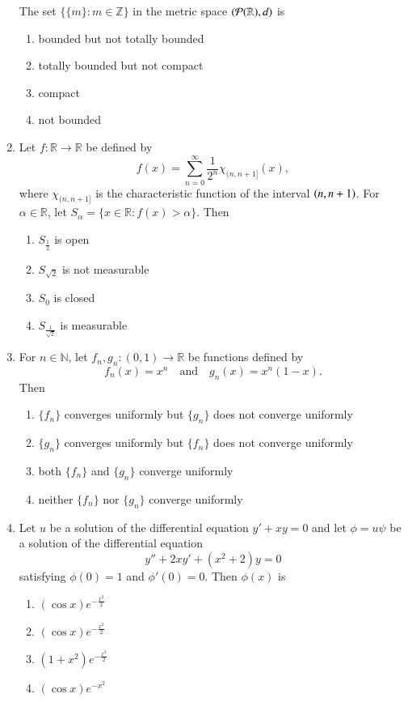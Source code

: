 \documentclass[journal,12pt,onecolumn]{IEEEtran}
\theoremstyle{remark}
\begin{document}
\begin{enumerate}[start=1, label=Q.\arabic*]
The set $\{ \{m\} : m \in \mathbb{Z}\}$ in the metric space $\left(\mathcal{P}(\mathbb{R}), d\right)$ is
\begin{enumerate}
\item bounded but not totally bounded
\item totally bounded but not compact
\item compact
\item not bounded
\end{enumerate}

\hfill{}

\item Let $f: \mathbb{R} \to \mathbb{R}$ be defined by
\[
f(x) = \sum_{n=0}^{\infty} \frac{1}{2^n}\chi_{(n,n+1]}(x),
\]
where $\chi_{(n,n+1]}$ is the characteristic function of the interval $\left(n,n+1\right)$. For $\alpha \in \mathbb{R}$, let $S_{\alpha} = \{x \in \mathbb{R} : f(x) > \alpha \}$. Then
\begin{enumerate}
\item $S_{\tfrac{1}{2}}$ is open
\item $S_{\sqrt{2}}$ is not measurable
\item $S_{0}$ is closed
\item $S_{\tfrac{1}{\sqrt{2}}}$ is measurable
\end{enumerate}

\hfill{}


\item For $n \in \mathbb{N}$, let $f_n, g_n : (0,1) \to \mathbb{R}$ be functions defined by
\[
f_n(x) = x^n \quad \text{and} \quad g_n(x) = x^n(1-x).
\]
Then
\begin{enumerate}
\item $\{f_n\}$ converges uniformly but $\{g_n\}$ does not converge uniformly
\item $\{g_n\}$ converges uniformly but $\{f_n\}$ does not converge uniformly
\item both $\{f_n\}$ and $\{g_n\}$ converge uniformly
\item neither $\{f_n\}$ nor $\{g_n\}$ converge uniformly
\end{enumerate}

\hfill{}


\item Let $u$ be a solution of the differential equation $y' + xy = 0$ and let $\phi = u\psi$ be a solution of the differential equation 
\[
y'' + 2xy' + (x^2+2)y = 0
\]
satisfying $\phi(0)=1$ and $\phi'(0)=0$. Then $\phi(x)$ is
\begin{enumerate}
\item $(\cos x)e^{-\tfrac{x^2}{2}}$
\item $(\cos x)e^{-\tfrac{x^2}{2}}$
\item $(1+x^2)e^{-\tfrac{x^2}{2}}$
\item $(\cos x)e^{-x^2}$
\end{enumerate}


\end{enumerate}
\end{document}
